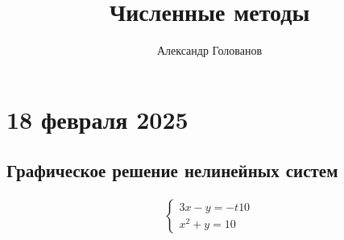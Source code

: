 \documentclass[]{article}
\title{Численные методы}
\author{Александр Голованов}
\begin{document}
\maketitle
\newpage
\tableofcontents
\newpage

\section{18 февраля 2025}
\subsection{Графическое решение нелинейных систем}

\begin{gather*}
\begin{cases}
3x-y =-t10\\
x^2+y=10
\end{cases}
\end{gather*}
\end{document}

